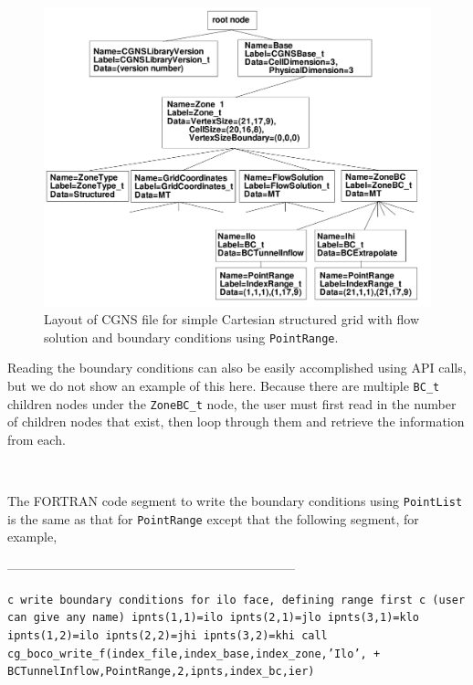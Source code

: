 \documentclass[12pt]{article}
\begin{document}
\begin{figure}[hpbt]
\centerline{{\includegraphics[width=150mm]{figures/tree_cartesian_BC}}}
\caption{Layout of CGNS file 
for simple Cartesian structured grid with flow
solution and boundary conditions using {\tt PointRange}.}
\label{FIGtree_cartesian_BC}
\end{figure}
%

Reading the boundary conditions can also be easily accomplished using
API calls, but we do not show an example of this here.
Because there are multiple {\tt BC\_t} children nodes under the
{\tt ZoneBC\_t} node, the user must first read in the number
of children nodes 
that exist, then loop through them and retrieve the information
from each.

~

\noindent{}

The FORTRAN code segment to write the boundary conditions using
{\tt PointList} is the same as that for {\tt PointRange} except
that the following segment, for example,

--------------------------------------------------------------------

{\tt \noindent c  write boundary conditions for ilo face, defining range first
\newline c  (user can give any name)
\newline\indent      ipnts(1,1)=ilo
\newline\indent      ipnts(2,1)=jlo
\newline\indent      ipnts(3,1)=klo
\newline\indent      ipnts(1,2)=ilo
\newline\indent      ipnts(2,2)=jhi
\newline\indent      ipnts(3,2)=khi
\newline\indent      call cg\_boco\_write\_f(index\_file,index\_base,index\_zone,'Ilo',
\newline + \indent BCTunnelInflow,PointRange,2,ipnts,index\_bc,ier)}
\end{document}
